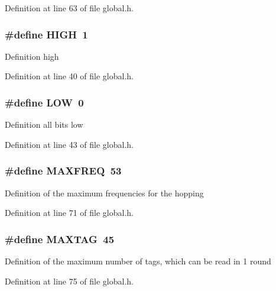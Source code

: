 Definition at line 63 of file global.\-h.

\subsubsection[{H\-I\-G\-H}]{\setlength{\rightskip}{0pt plus 5cm}\#define H\-I\-G\-H~1}\label{global_8h_a5bb885982ff66a2e0a0a45a8ee9c35e2}
Definition high 

Definition at line 40 of file global.\-h.

\subsubsection[{L\-O\-W}]{\setlength{\rightskip}{0pt plus 5cm}\#define L\-O\-W~0}\label{global_8h_ab811d8c6ff3a505312d3276590444289}
Definition all bits low 

Definition at line 43 of file global.\-h.

\subsubsection[{M\-A\-X\-F\-R\-E\-Q}]{\setlength{\rightskip}{0pt plus 5cm}\#define M\-A\-X\-F\-R\-E\-Q~53}\label{global_8h_af8269d8159f700256b8bd0fb67b5a882}
Definition of the maximum frequencies for the hopping 

Definition at line 71 of file global.\-h.

\subsubsection[{M\-A\-X\-T\-A\-G}]{\setlength{\rightskip}{0pt plus 5cm}\#define M\-A\-X\-T\-A\-G~45}\label{global_8h_adf4e7d5cd456c172af91b499031d5649}
Definition of the maximum number of tags, which can be read in 1 round 

Definition at line 75 of file global.\-h.


